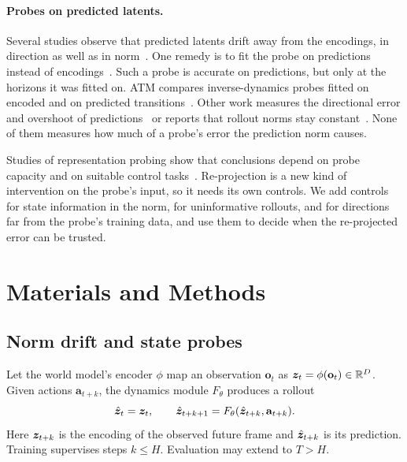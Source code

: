 \paragraph{Probes on predicted latents.}
Several studies observe that predicted latents drift away from the encodings, in direction as well as in norm~\citep{ye2021mastering,wu2023slotformer,shah2026rollout}. One remedy is to fit the probe on predictions instead of encodings~\citep{Bear2021Physion,Nayebi2023MentalSim,Rao2026SkyJEPA,zheng2026contactguard}. Such a probe is accurate on predictions, but only at the horizons it was fitted on. ATM compares inverse-dynamics probes fitted on encoded and on predicted transitions~\citep{chen2026atm}. Other work measures the directional error and overshoot of predictions~\citep{vakalis2026intervention} or reports that rollout norms stay constant~\citep{sivasankar2026adaptive}. None of them measures how much of a probe's error the prediction norm causes.

Studies of representation probing show that conclusions depend on probe capacity and on suitable control tasks~\citep{alain2016understanding,Hewitt2019ControlTasks,Pimentel2020Probing,Voita2020MDL,Belinkov2022Probing}. Re-projection is a new kind of intervention on the probe's input, so it needs its own controls. We add controls for state information in the norm, for uninformative rollouts, and for directions far from the probe's training data, and use them to decide when the re-projected error can be trusted.

\section{Materials and Methods}
\label{sec:methods}
\subsection{Norm drift and state probes}
\label{sec:background}
\label{sec:formal_setup}
Let the world model's encoder $\phi$ map an observation $\mathbf o_t$ as $\bm{z}_t=\phi(\mathbf o_t)\in\mathbb R^D$. Given actions $\mathbf a_{t+k}$, the dynamics module $F_\theta$ produces a rollout
\begin{equation}
\hat{\bm{z}}_t=\bm{z}_t,\qquad
\hat{\bm{z}}_{t+k+1}=F_\theta(\hat{\bm{z}}_{t+k},\mathbf{a}_{t+k}).
\label{eq:recurrence}
\end{equation}
Here $\bm{z}_{t+k}$ is the encoding of the observed future frame and $\hat{\bm{z}}_{t+k}$ is its prediction. Training supervises steps $k\le H$. Evaluation may extend to $T>H$.

